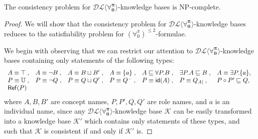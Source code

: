 \documentclass[a4paper,UKenglish]{lipics}
\newcommand{\Lang}{\ensuremath{\mathbf{\forall_{0}^{\pi}}}\xspace}
\newcommand{\LangBounded}[1]{\ensuremath{(\forall_{0}^{\pi})^{\leq #1}}\xspace}
\newcommand{\dlLang}{\ensuremath{\mathcal{DL\langle}\Lang\mathcal{\rangle}}\xspace}
\newcommand{\isreflexive}[1]{\mathsf{Ref}(#1)}
\newcommand{\roleidentity}[1]{\mathsf{id}(#1)}
\newcommand{\universalrole}{\mathbb{U}}
\begin{document}
\begin{theorem}\label{DLANGT}
The consistency problem for \dlLang-knowledge bases is \textsc{NP}-complete.
\end{theorem}
\begin{proof}
We will show that the consistency problem for \dlLang-knowledge bases
reduces to the satisfiability problem for \LangBounded{2}-formulae.

We begin with observing that we can restrict our attention to
\dlLang-knowledge bases containing only statements of the following
types:
\[
\begin{array}{lllllll}
  A \equiv \top \;,& A \equiv \neg B \;,& A \equiv B \sqcup B' \;,& A \equiv \{a\} \;,& A \Issub \forall P.B \;,& \exists P.A \Issub B \;,& A \equiv \exists P.\{a\},\\
  P \equiv \universalrole \;,& P \equiv \neg Q \;,& P \equiv Q \sqcup Q' \;,& P \equiv Q^{-} \;,& P \equiv \roleidentity{A} \;,& P \equiv Q_{A|} \;,& P \circ P' \Issub Q,\\
  \isreflexive{P}
\end{array}
\]
where $A,B,B'$ are concept names, $P,P',Q,Q'$ are role names, and $a$ is
an individual name, since any \dlLang-knowledge base $\mathcal{K}$ can
be easily transformed into a knowledge base $\mathcal{K'}$ which
contains only statements of these types, and such that $\mathcal{K}$
is consistent if and only if $\mathcal{K'}$ is.


\end{proof}
\end{document}
